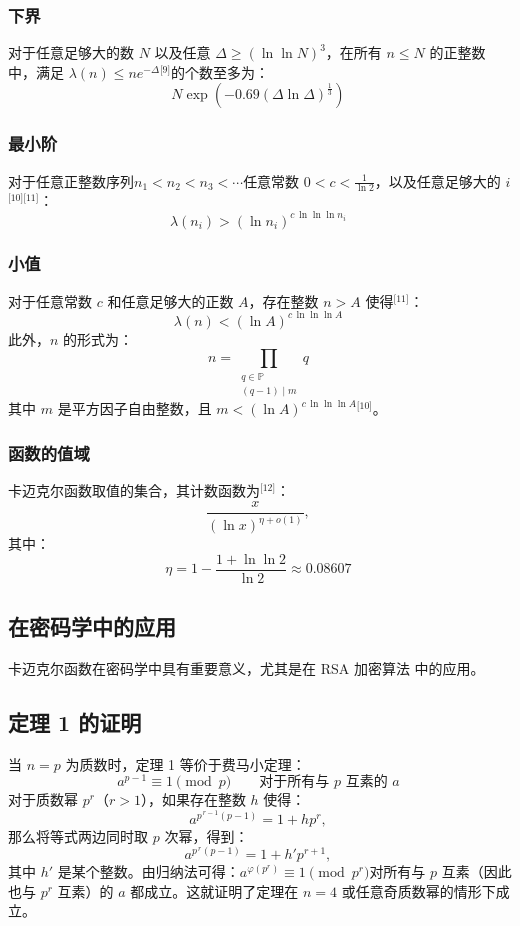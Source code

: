 \subsubsection{下界}
对于任意足够大的数 $N$ 以及任意 $\Delta \ge (\ln \ln N)^{3}$，在所有 $n \le N$ 的正整数中，满足 $\lambda(n) \le n e^{-\Delta}$\(^\text{[9]}\)的个数至多为：
$$
N \exp\left( -0.69 (\Delta \ln \Delta)^{\frac{1}{3}} \right)~
$$
\subsubsection{最小阶}
对于任意正整数序列$n_{1} < n_{2} < n_{3} < \cdots$任意常数 $0 < c < \frac{1}{\ln 2}$，以及任意足够大的 $i$\(^\text{[10][11]}\)：
$$
\lambda(n_{i}) > \left( \ln n_{i} \right)^{c \, \ln \ln \ln n_{i}}~
$$
\subsubsection{小值}
对于任意常数 $c$ 和任意足够大的正数 $A$，存在整数 $n > A$ 使得\(^\text{[11]}\)：
$$
\lambda(n) < \left( \ln A \right)^{c \, \ln \ln \ln A}~
$$
此外，$n$ 的形式为：
$$
n = \prod_{\substack{q \in \mathbb{P} \\ (q - 1) \mid m}} q~
$$
其中 $m$ 是平方因子自由整数，且 $m < (\ln A)^{c \, \ln \ln \ln A}$\(^\text{[10]}\)。
\subsubsection{函数的值域}
卡迈克尔函数取值的集合，其计数函数为\(^\text{[12]}\)：
$$
\frac{x}{(\ln x)^{\eta + o(1)}},~
$$
其中：
$$
\eta = 1 - \frac{1 + \ln \ln 2}{\ln 2} \approx 0.08607~
$$
\subsection{在密码学中的应用}
卡迈克尔函数在密码学中具有重要意义，尤其是在 RSA 加密算法 中的应用。
\subsection{定理 1 的证明}
当 $n = p$ 为质数时，定理 1 等价于费马小定理：
$$
a^{p-1} \equiv 1 \pmod{p} \qquad \text{对于所有与 } p \text{ 互素的 } a~
$$
对于质数幂 $p^{r}$（$r > 1$），如果存在整数 $h$ 使得：
$$
a^{p^{\,r-1}(p - 1)} = 1 + h p^{r},~
$$
那么将等式两边同时取 $p$ 次幂，得到：
$$
a^{p^{\,r}(p - 1)} = 1 + h' p^{r+1},~
$$
其中 $h'$ 是某个整数。由归纳法可得：$a^{\varphi(p^{r})} \equiv 1 \pmod{p^{r}}$对所有与 $p$ 互素（因此也与 $p^{r}$ 互素）的 $a$ 都成立。这就证明了定理在 $n = 4$ 或任意奇质数幂的情形下成立。
